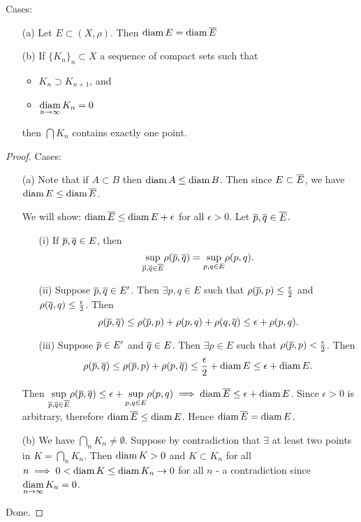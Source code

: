\documentclass[]{article}
\begin{document}
\begin{theorem}
	Cases:
	\begin{enumerate}
		\item[(a)] Let $E\subset(X,\rho)$. Then $\text{diam}\,E = \text{diam}\,\overline{E}$
		\item[(b)] If $\{K_n\}_n\subset X$ a sequence of compact sets such that
			\begin{itemize}
				\item $K_n\supset K_{n+1}$, and
				\item $\underset{n\rightarrow\infty}{\text{diam}}\, K_n = 0$
			\end{itemize}
			then $\bigcap K_n$ contains exactly one point.
	\end{enumerate}
	\label{thm-3-10}
\end{theorem}
\begin{proof}
	Cases:
	\begin{enumerate}
		\item[(a)] \say{$\geq$}
			Note that if $A\subset B$ then $\text{diam}\,A\leq \text{diam}\,B$.
			Then since $E\subset\overline{E}$, we have \ul{$\text{diam}\,E\leq \text{diam}\,\overline{E}$}.

			\say{$\leq$} We will show: $\text{diam}\,\overline{E}\leq \text{diam}\,E + \epsilon$ for all $\epsilon >0$.
			Let $\overline{p}, \overline{q}\in \overline{E}$. 
			\begin{enumerate}
				\item[(i)] If $\overline{p}, \overline{q}\in E$, then $$\underset{\overline{p},\overline{q}\in \overline{E}}{\sup}\rho(\overline{p},\overline{q}) = \underset{p,q\in E}{\sup}\rho(p,q).$$
				\item[(ii)] Suppose $\overline{p}, \overline{q}\in E'$. Then $\exists p,q\in E$ such that $\rho(\overline{p},p)\leq \frac{\epsilon}{2}$ and $\rho(\overline{q},q)\leq \frac{\epsilon}{2}$.
					Then $$\rho(\overline{p},\overline{q})\leq \rho(\overline{p},p) + \rho(p,q) + \rho(q,\overline{q}) \leq \epsilon + \rho(p,q).$$
				\item[(iii)] Suppose $\overline{p}\in E'$ and $\overline{q}\in E$. Then $\exists p\in E$ such that $\rho(\overline{p}, p) < \frac{\epsilon}{2}$.
					Then $$\rho(\overline{p},\overline{q}) \leq \rho(\overline{p},p) + \rho(p,\overline{q}) \leq \frac{\epsilon}{2} + \text{diam}\,E \leq \epsilon + \text{diam}\,E.$$
			\end{enumerate}
			Then $\underset{\overline{p},\overline{q}\in \overline{E}}{\sup}\rho(\overline{p},\overline{q}) \leq \epsilon + \underset{p,q\in E}{\sup}\rho(p,q) \implies \text{diam}\,\overline{E} \leq \epsilon + \text{diam}\,E$.
			Since $\epsilon > 0$ is arbitrary, therefore $\text{diam}\,\overline{E}\leq \text{diam}\,E$.
			Hence $\text{diam}\,\overline{E} = \text{diam}\,E$.

		\item[(b)] We have $\bigcap_n K_n \neq \emptyset$.
			Suppose by contradiction that $\exists$ at least two points in $K = \bigcap_n K_n$.
			Then $\text{diam}\,K> 0$ and $K\subset K_n$ for all $n \implies 0 < \text{diam}\,K \leq \text{diam}\,K_n \rightarrow 0$ for all $n$ - a contradiction since $\underset{n\rightarrow\infty}{\text{diam}}\,K_n = 0$.
	\end{enumerate}
	Done.
\end{proof}
\end{document}
